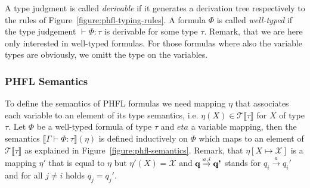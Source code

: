A type judgment is called \textit{derivable} if it generates a derivation tree respectively to the rules of
Figure~\ref{figure:phfl-typing-rules}. A formula $\Phi$ is called \textit{well-typed} if the type
judgement $\vdash \Phi:\tau$ is derivable for some type $\tau$. Remark, that we are here only interested in
well-typed formulas. For those formulas where also the variable types are obviously, we omitt the type on the
variables.


\subsubsection{PHFL Semantics}

To define the semantics of PHFL formulas we need mapping $\eta$ that associates each variable to an element of its
type semantics, i.e. $\eta(X) \in \mathcal{T}\llbracket\tau\rrbracket$ for $X$ of type $\tau$. Let $\Phi$ be a
well-typed formula of type $\tau$ and $eta$ a variable mapping, then the semantics $\llbracket\Gamma \vdash \Phi
\colon \tau \rrbracket(\eta)$ is defined inductively on $\Phi$ which maps to an element of
$\mathcal{T}\llbracket\tau\rrbracket$ as explained in Figure~\ref{figure:phfl-semantics}.
Remark, that $\eta[X \mapsto \mathcal{X}]$ is a mapping $\eta'$ that is equal to $\eta$ but $\eta'(X) = \mathcal{X}$ and
$\emph{q} \overset{a, i}{\rightarrow} \emph{q'}$ stands for $q_i \overset{a}{\rightarrow} {q_i}'$ and for all $j \neq i$
holds $q_j = {q_j}'$.

